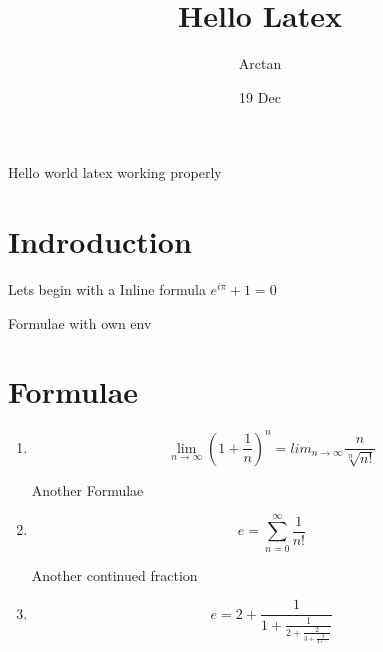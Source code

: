 \documentclass{article}
\title{Hello Latex}
\author{Arctan}
\date{19 Dec}
\begin{document}
    \maketitle
    Hello world  latex working properly
    \section{Indroduction}

    Lets begin with a Inline formula $e^{i\pi} + 1 =0$

Formulae with own env
    \section{Formulae}
    \begin{enumerate}
    A Formulae
   \item  $$ \lim_{n\to\infty} \left(1+\frac{1}{n}\right)^n = lim_{n\to\infty}\frac{n}{\sqrt[n]{n!}} $$

    Another Formulae
    \item $$e = \sum_{n=0}^{\infty}\frac{1}{n!}$$
    
    Another continued fraction

    \item $$e = 2+\frac{1}{1+\frac{1}{2+\frac{2}{3+\frac{3}{4+\ddots}}}}$$
\end{enumerate}
\end{document}

